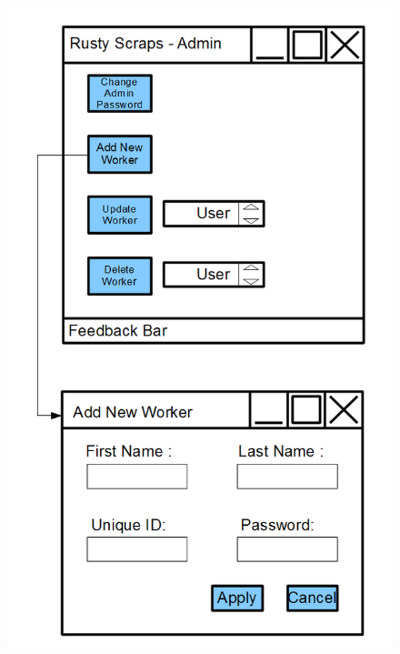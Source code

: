 \begin{figure}[H]
    \includegraphics[width=\textwidth]{./Design/Images/AddWorker.png}
\end{figure}


